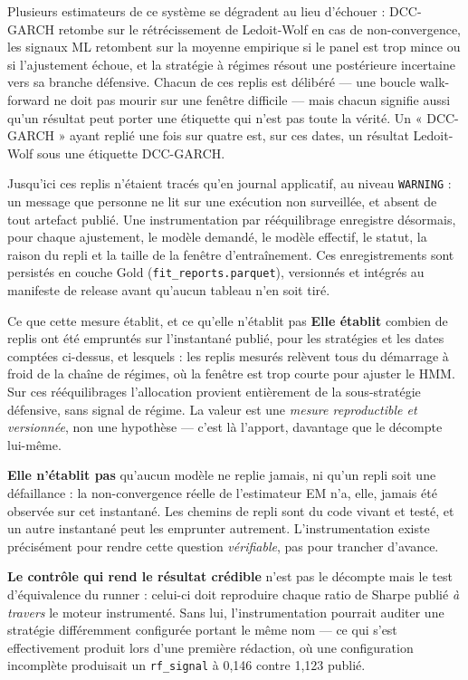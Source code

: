 Plusieurs estimateurs de ce système se dégradent au lieu d'échouer : DCC-GARCH
retombe sur le rétrécissement de Ledoit-Wolf en cas de non-convergence, les
signaux ML retombent sur la moyenne empirique si le panel est trop mince ou si
l'ajustement échoue, et la stratégie à régimes résout une postérieure incertaine
vers sa branche défensive. Chacun de ces replis est délibéré — une boucle
walk-forward ne doit pas mourir sur une fenêtre difficile — mais chacun signifie
aussi qu'un résultat peut porter une étiquette qui n'est pas toute la vérité. Un
« DCC-GARCH » ayant replié une fois sur quatre est, sur ces dates, un résultat
Ledoit-Wolf sous une étiquette DCC-GARCH.

Jusqu'ici ces replis n'étaient tracés qu'en journal applicatif, au niveau
\texttt{WARNING} : un message que personne ne lit sur une exécution non
surveillée, et absent de tout artefact publié. Une instrumentation par
rééquilibrage enregistre désormais, pour chaque ajustement, le modèle demandé,
le modèle effectif, le statut, la raison du repli et la taille de la fenêtre
d'entraînement. Ces enregistrements sont persistés en couche Gold
(\texttt{fit\_reports.parquet}), versionnés et intégrés au manifeste de release
avant qu'aucun tableau n'en soit tiré.



\integriteVerdict{}

\begin{resultatbox}{Ce que cette mesure établit, et ce qu'elle n'établit pas}
\textbf{Elle établit} combien de replis ont été empruntés sur l'instantané
publié, pour les stratégies et les dates comptées ci-dessus, et lesquels : les
\integriteReplis{} replis mesurés relèvent tous du démarrage à froid de la
chaîne de régimes, où la fenêtre est trop courte pour ajuster le HMM. Sur ces
rééquilibrages l'allocation provient entièrement de la sous-stratégie
défensive, sans signal de régime. La valeur est une \emph{mesure reproductible
et versionnée}, non une hypothèse — c'est là l'apport, davantage que le
décompte lui-même.

\textbf{Elle n'établit pas} qu'aucun modèle ne replie jamais, ni qu'un repli
soit une défaillance : la non-convergence réelle de l'estimateur EM n'a, elle,
jamais été observée sur cet instantané. Les chemins de repli sont du code
vivant et testé, et un autre instantané peut les emprunter autrement.
L'instrumentation existe précisément pour rendre cette question
\emph{vérifiable}, pas pour trancher d'avance.

\textbf{Le contrôle qui rend le résultat crédible} n'est pas le décompte mais le
test d'équivalence du runner : celui-ci doit reproduire chaque ratio de Sharpe
publié \emph{à travers} le moteur instrumenté. Sans lui, l'instrumentation
pourrait auditer une stratégie différemment configurée portant le même nom —
ce qui s'est effectivement produit lors d'une première rédaction, où une
configuration incomplète produisait un \texttt{rf\_signal} à 0,146 contre 1,123
publié.
\end{resultatbox}

